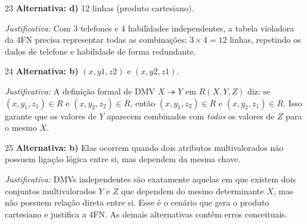 \documentclass[12pt]{article}
\begin{document}
\vspace{0.5cm}

\begin{gabbox}{23}
\textbf{Alternativa: d)} 12 linhas (produto cartesiano).

\smallskip
\textit{Justificativa:} Com 3 telefones e 4 habilidades independentes, a tabela violadora da 4FN precisa representar todas as combinações: $3 \times 4 = 12$ linhas, repetindo os dados de telefone e habilidade de forma redundante.
\end{gabbox}

\vspace{0.5cm}

\begin{gabbox}{24}
\textbf{Alternativa: b)} $(x, y1, z2)$ e $(x, y2, z1)$.

\smallskip
\textit{Justificativa:} A definição formal de DMV $X \twoheadrightarrow Y$ em $R(X,Y,Z)$ diz: se $(x, y_1, z_1) \in R$ e $(x, y_2, z_2) \in R$, então $(x, y_1, z_2) \in R$ e $(x, y_2, z_1) \in R$. Isso garante que os valores de $Y$ aparecem combinados com \emph{todos} os valores de $Z$ para o mesmo $X$.
\end{gabbox}

\vspace{0.5cm}

\begin{gabbox}{25}
\textbf{Alternativa: b)} Elas ocorrem quando dois atributos multivalorados não possuem ligação lógica entre si, mas dependem da mesma chave.

\smallskip
\textit{Justificativa:} DMVs independentes são exatamente aquelas em que existem dois conjuntos multivalorados $Y$ e $Z$ que dependem do mesmo determinante $X$, mas não possuem relação direta entre si. Esse é o cenário que gera o produto cartesiano e justifica a 4FN. As demais alternativas contêm erros conceituais.
\end{gabbox}

\vspace{1cm}
\end{document}
